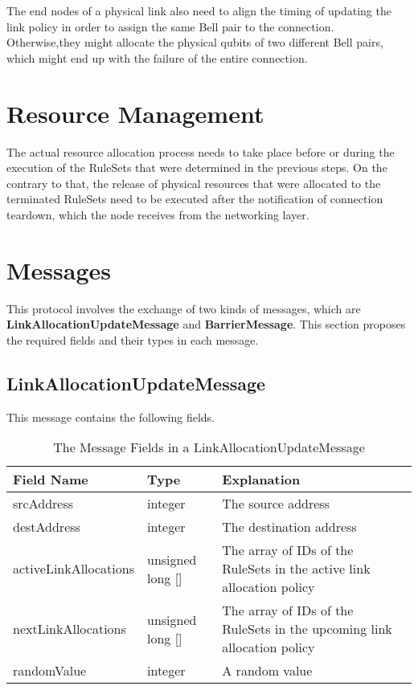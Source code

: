 The end nodes of a physical link also need to align the timing of updating the link policy in order to assign the same Bell pair to the connection.
Otherwise,they might allocate the physical qubits of two different Bell pairs, which might end up with the failure of the entire connection.

\section{Resource Management}

The actual resource allocation process needs to take place before or during the execution of the RuleSets that were determined in the previous steps.
On the contrary to that, the release of physical resources that were allocated to the terminated RuleSets need to be executed after the notification of connection teardown, which the node receives from the networking layer.

\section{Messages}

This protocol involves the exchange of two kinds of messages, which are \textbf{LinkAllocationUpdateMessage} and \textbf{BarrierMessage}.
This section proposes the required fields and their types in each message.

\subsection{LinkAllocationUpdateMessage}
 
This message contains the following fields.

\begin{table}[ht]
  \begin{center}
    \begin{tabular}{|m{10em}|m{10em}|m{10em}|} \hline
      Field Name & Type & Explanation \\ \hline \cline{1-3}
      srcAddress & integer & The source address \\ \cline{1-3}
      destAddress & integer & The destination address \\ \cline{1-3}
      activeLinkAllocations & unsigned long [] & The array of IDs of the RuleSets in the active link allocation policy \\ \cline{1-3}
      nextLinkAllocations & unsigned long [] & The array of IDs of the RuleSets in the upcoming link allocation policy \\ \cline{1-3}
      randomValue & integer & A random value \\ \cline{1-3}
    \end{tabular}
    \caption{The Message Fields in a LinkAllocationUpdateMessage}
  \end{center}
\end{table}

